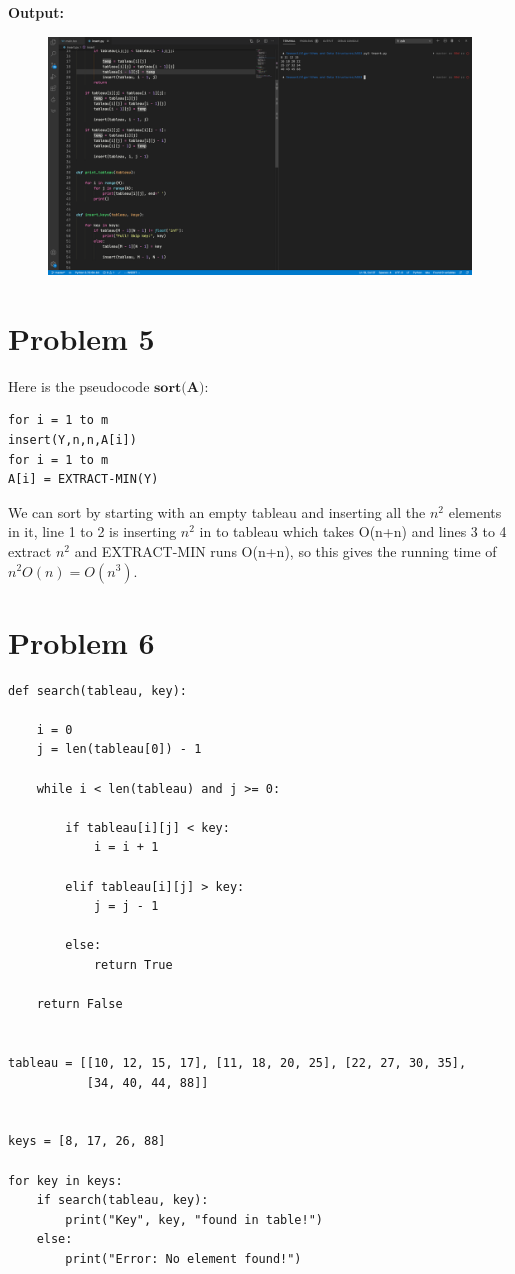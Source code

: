 \documentclass{article}
\begin{document}
\textbf{Output:}
\begin{figure}[H]
    \centering
    \includegraphics[width=1\textwidth]{Fig1}
\end{figure}

\section{Problem 5}
Here is the pseudocode $\textbf{sort(A)}$:
\begin{lstlisting}
for i = 1 to m
insert(Y,n,n,A[i])
for i = 1 to m
A[i] = EXTRACT-MIN(Y)
\end{lstlisting}

We can sort by starting with an empty tableau and inserting all the $n^2$ elements in it,
line 1 to 2 is inserting $n^2$ in to tableau which takes O(n+n) and lines 3 to 4 extract $n^2$ and EXTRACT-MIN runs O(n+n),
so this gives the running time of $n^2O(n) = O(n^3)$.

\section{Problem 6}
\begin{lstlisting}
def search(tableau, key):

    i = 0
    j = len(tableau[0]) - 1

    while i < len(tableau) and j >= 0:

        if tableau[i][j] < key:
            i = i + 1

        elif tableau[i][j] > key:
            j = j - 1

        else:
            return True

    return False


tableau = [[10, 12, 15, 17], [11, 18, 20, 25], [22, 27, 30, 35],
           [34, 40, 44, 88]]


keys = [8, 17, 26, 88]

for key in keys:
    if search(tableau, key):
        print("Key", key, "found in table!")
    else:
        print("Error: No element found!")
\end{lstlisting}
\end{document}
